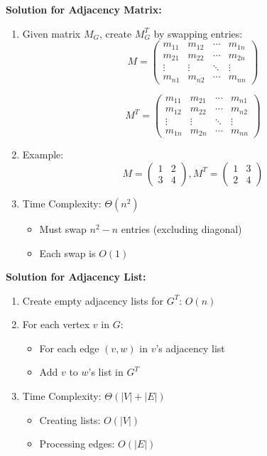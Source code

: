 \textbf{Solution for Adjacency Matrix:}
\begin{enumerate}[leftmargin=*,noitemsep]
    \item Given matrix $M_G$, create $M_G^T$ by swapping entries:
    \[ M = \begin{pmatrix}
        m_{11} & m_{12} & \cdots & m_{1n}\\
        m_{21} & m_{22} & \cdots & m_{2n}\\
        \vdots & \vdots & \ddots & \vdots\\
        m_{n1} & m_{n2} & \cdots & m_{nn}
    \end{pmatrix} \]
    
    \[ M^T = \begin{pmatrix}
        m_{11} & m_{21} & \cdots & m_{n1}\\
        m_{12} & m_{22} & \cdots & m_{n2}\\
        \vdots & \vdots & \ddots & \vdots\\
        m_{1n} & m_{2n} & \cdots & m_{nn}
    \end{pmatrix} \]

    \item Example:
    \[ M = \begin{pmatrix}1 & 2\\ 3 & 4\end{pmatrix}, 
       M^T = \begin{pmatrix}1 & 3\\ 2 & 4\end{pmatrix} \]
    
    \item Time Complexity: $\Theta(n^2)$
        \begin{itemize}[noitemsep]
            \item Must swap $n^2-n$ entries (excluding diagonal)
            \item Each swap is $O(1)$
        \end{itemize}
\end{enumerate}

\textbf{Solution for Adjacency List:}
\begin{enumerate}[leftmargin=*,noitemsep]
    \item Create empty adjacency lists for $G^T$: $O(n)$
    \item For each vertex $v$ in $G$:
        \begin{itemize}[noitemsep]
            \item For each edge $(v,w)$ in $v$'s adjacency list
            \item Add $v$ to $w$'s list in $G^T$
        \end{itemize}
    \item Time Complexity: $\Theta(|V| + |E|)$
        \begin{itemize}[noitemsep]
            \item Creating lists: $O(|V|)$
            \item Processing edges: $O(|E|)$
        \end{itemize}
\end{enumerate}

